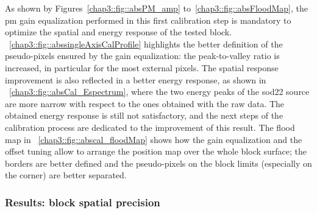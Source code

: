 As shown by Figures~\ref{chap3::fig::absPM_amp} to~\ref{chap3::fig::absFloodMap}, the \gls{pm} gain equalization performed in this first calibration step is mandatory to optimize the spatial and energy response of the tested block. \figurename~\ref{chap3::fig::abssingleAxisCalProfile} highlights the better definition of the pseudo-pixels ensured by the gain equalization: the peak-to-valley ratio is increased, in particular for the most external pixels. The spatial response improvement is also reflected in a better energy response, as shown in \figurename~\ref{chap3::fig::absCal_Espectrum}, where the two energy peaks of the \gls{sod22} source are more narrow with respect to the ones obtained with the raw data. The obtained energy response is still not satisfactory, and the next steps of the calibration process are dedicated to the improvement of this result. The flood map in \figurename~\ref{chap3::fig::abscal_floodMap} shows how the gain equalization and the offset tuning allow to arrange the position map over the whole block surface; the borders are better defined and the pseudo-pixels on the block limits (especially on the corner) are better separated. 


\subsubsection{Results: block spatial precision}\label{chap3::subsubsec::absBlockSpatialAcc}

